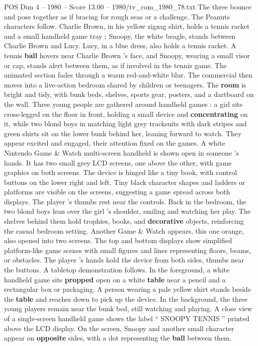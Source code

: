 \begin{textsample}{POS Dim 4 – 1980 – Score 13.00 – 1980/tv\_com\_1980\_78.txt}
The three bounce and pose together as if bracing for rough seas or a challenge.
The Peanuts characters follow.
Charlie Brown, in his yellow zigzag shirt, holds a tennis racket and a small handheld game tray ; Snoopy, the white beagle, stands between Charlie Brown and Lucy.
Lucy, in a blue dress, also holds a tennis racket.
A tennis \textbf{ball} hovers near Charlie Brown ’s face, and Snoopy, wearing a small visor or cap, stands alert between them, as if involved in the tennis game.
The animated section fades through a warm red-and-white blur.
The commercial then moves into a live-action bedroom shared by children or teenagers.
The \textbf{room} is bright and tidy, with bunk beds, shelves, sports gear, posters, and a dartboard on the wall.
Three young people are gathered around handheld games : a girl sits cross-legged on the floor in front, holding a small device and \textbf{concentrating} on it, while two blond boys in matching light grey tracksuits with dark stripes and green shirts sit on the lower bunk behind her, leaning forward to watch.
They appear excited and engaged, their attention fixed on the games.
A white Nintendo Game \& Watch multi-screen handheld is shown open in someone ’s hands.
It has two small grey LCD screens, one above the other, with game graphics on both screens.
The device is hinged like a tiny book, with control buttons on the lower right and left.
Tiny black character shapes and ladders or platforms are visible on the screens, suggesting a game spread across both displays.
The player ’s thumbs rest near the controls.
Back in the bedroom, the two blond boys lean over the girl ’s shoulder, smiling and watching her play.
The shelves behind them hold trophies, books, and \textbf{decorative} objects, reinforcing the casual bedroom setting.
Another Game \& Watch appears, this one orange, also opened into two screens.
The top and bottom displays show simplified platform-like game scenes with small figures and lines representing floors, beams, or obstacles.
The player ’s hands hold the device from both sides, thumbs near the buttons.
A tabletop demonstration follows.
In the foreground, a white handheld game sits \textbf{propped} open on a white \textbf{table} near a pencil and a rectangular box or packaging.
A person wearing a pale yellow shirt stands beside the \textbf{table} and reaches down to pick up the device.
In the background, the three young players remain near the bunk bed, still watching and playing.
A close view of a single-screen handheld game shows the label “ SNOOPY TENNIS ” printed above the LCD display.
On the screen, Snoopy and another small character appear on \textbf{opposite} sides, with a dot representing the \textbf{ball} between them.

\end{textsample}
